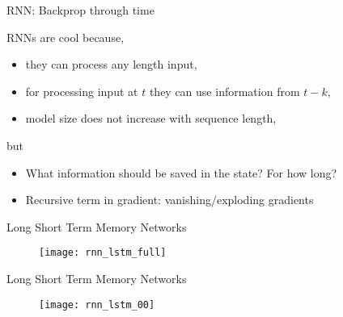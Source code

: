 \begin{frame}{RNN: Backprop through time}

  RNNs are cool because,
  \begin{itemize}
    \item they can process any length input,
    \item for processing input at $t$ they can use information from $t-k$,
    \item model size does not increase with sequence length,
  \end{itemize}
  but
  \begin{itemize}
    \item What information should be saved in the state? For how long?
    \item Recursive term in gradient: vanishing/exploding gradients
  \end{itemize}

\end{frame}


\begin{frame}{Long Short Term Memory Networks}

  \begin{figure}
    \texttt{[image: rnn\_lstm\_full]}
  \end{figure}

\end{frame}


\begin{frame}{Long Short Term Memory Networks}

  \begin{figure}
    \texttt{[image: rnn\_lstm\_00]}
  \end{figure}

\end{frame}


